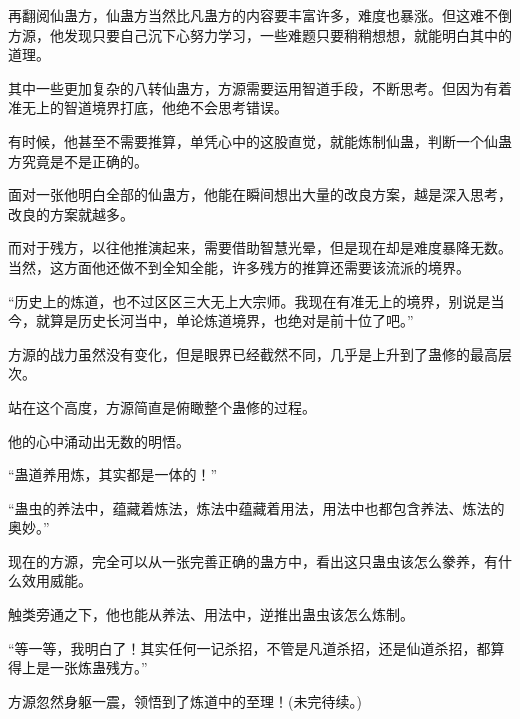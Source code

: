 \begin{this_body}
再翻阅仙蛊方，仙蛊方当然比凡蛊方的内容要丰富许多，难度也暴涨。但这难不倒方源，他发现只要自己沉下心努力学习，一些难题只要稍稍想想，就能明白其中的道理。

其中一些更加复杂的八转仙蛊方，方源需要运用智道手段，不断思考。但因为有着准无上的智道境界打底，他绝不会思考错误。

有时候，他甚至不需要推算，单凭心中的这股直觉，就能炼制仙蛊，判断一个仙蛊方究竟是不是正确的。

面对一张他明白全部的仙蛊方，他能在瞬间想出大量的改良方案，越是深入思考，改良的方案就越多。

而对于残方，以往他推演起来，需要借助智慧光晕，但是现在却是难度暴降无数。当然，这方面他还做不到全知全能，许多残方的推算还需要该流派的境界。

“历史上的炼道，也不过区区三大无上大宗师。我现在有准无上的境界，别说是当今，就算是历史长河当中，单论炼道境界，也绝对是前十位了吧。”

方源的战力虽然没有变化，但是眼界已经截然不同，几乎是上升到了蛊修的最高层次。

站在这个高度，方源简直是俯瞰整个蛊修的过程。

他的心中涌动出无数的明悟。

“蛊道养用炼，其实都是一体的！”

“蛊虫的养法中，蕴藏着炼法，炼法中蕴藏着用法，用法中也都包含养法、炼法的奥妙。”

现在的方源，完全可以从一张完善正确的蛊方中，看出这只蛊虫该怎么豢养，有什么效用威能。

触类旁通之下，他也能从养法、用法中，逆推出蛊虫该怎么炼制。

“等一等，我明白了！其实任何一记杀招，不管是凡道杀招，还是仙道杀招，都算得上是一张炼蛊残方。”

方源忽然身躯一震，领悟到了炼道中的至理！(未完待续。)

\end{this_body}

